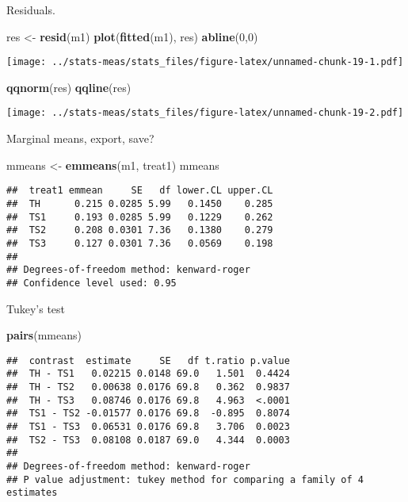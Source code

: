 \documentclass[
]{article}
\newenvironment{Shaded}{\begin{snugshade}}{\end{snugshade}}
\newcommand{\DecValTok}[1]{\textcolor[rgb]{0.00,0.00,0.81}{#1}}
\newcommand{\FunctionTok}[1]{\textcolor[rgb]{0.13,0.29,0.53}{\textbf{#1}}}
\newcommand{\NormalTok}[1]{#1}
\newcommand{\OtherTok}[1]{\textcolor[rgb]{0.56,0.35,0.01}{#1}}
\newcommand{\StringTok}[1]{\textcolor[rgb]{0.31,0.60,0.02}{#1}}
\begin{document}
Residuals.

\begin{Shaded}
\begin{Highlighting}[]
\NormalTok{res }\OtherTok{\textless{}{-}} \FunctionTok{resid}\NormalTok{(m1)}
\FunctionTok{plot}\NormalTok{(}\FunctionTok{fitted}\NormalTok{(m1), res)}
\FunctionTok{abline}\NormalTok{(}\DecValTok{0}\NormalTok{,}\DecValTok{0}\NormalTok{)}
\end{Highlighting}
\end{Shaded}

\texttt{[image: ../stats-meas/stats\_files/figure-latex/unnamed-chunk-19-1.pdf]}

\begin{Shaded}
\begin{Highlighting}[]
\FunctionTok{qqnorm}\NormalTok{(res)}
\FunctionTok{qqline}\NormalTok{(res)}
\end{Highlighting}
\end{Shaded}

\texttt{[image: ../stats-meas/stats\_files/figure-latex/unnamed-chunk-19-2.pdf]}

Marginal means, export, save?

\begin{Shaded}
\begin{Highlighting}[]
\NormalTok{mmeans }\OtherTok{\textless{}{-}} \FunctionTok{emmeans}\NormalTok{(m1, }\StringTok{\textquotesingle{}treat1\textquotesingle{}}\NormalTok{)}
\NormalTok{mmeans}
\end{Highlighting}
\end{Shaded}

\begin{verbatim}
##  treat1 emmean     SE   df lower.CL upper.CL
##  TH      0.215 0.0285 5.99   0.1450    0.285
##  TS1     0.193 0.0285 5.99   0.1229    0.262
##  TS2     0.208 0.0301 7.36   0.1380    0.279
##  TS3     0.127 0.0301 7.36   0.0569    0.198
## 
## Degrees-of-freedom method: kenward-roger 
## Confidence level used: 0.95
\end{verbatim}

Tukey's test

\begin{Shaded}
\begin{Highlighting}[]
\FunctionTok{pairs}\NormalTok{(mmeans)}
\end{Highlighting}
\end{Shaded}

\begin{verbatim}
##  contrast  estimate     SE   df t.ratio p.value
##  TH - TS1   0.02215 0.0148 69.0   1.501  0.4424
##  TH - TS2   0.00638 0.0176 69.8   0.362  0.9837
##  TH - TS3   0.08746 0.0176 69.8   4.963  <.0001
##  TS1 - TS2 -0.01577 0.0176 69.8  -0.895  0.8074
##  TS1 - TS3  0.06531 0.0176 69.8   3.706  0.0023
##  TS2 - TS3  0.08108 0.0187 69.0   4.344  0.0003
## 
## Degrees-of-freedom method: kenward-roger 
## P value adjustment: tukey method for comparing a family of 4 estimates
\end{verbatim}
\end{document}
